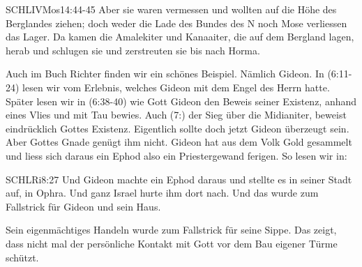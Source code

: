 \documentclass[fontsize=16pt]{mybib}
\begin{document}
\begin{bibelbox}{SCHL}{IVMos}{14:44-45}
        Aber sie waren vermessen und wollten auf die Höhe des Berglandes ziehen; doch weder die Lade des Bundes des \herr N noch Mose verliessen das Lager. Da kamen die Amalekiter und Kanaaiter, die auf dem Bergland lagen, herab und schlugen sie und zerstreuten sie bis nach Horma.
    \end{bibelbox} 
\begin{otsblock}
    Auch im Buch Richter finden wir ein schönes Beispiel. Nämlich Gideon. In (6:11-24) lesen wir vom Erlebnis, welches Gideon mit dem Engel des Herrn hatte. Später lesen wir in (6:38-40) wie Gott Gideon den Beweis seiner Existenz, anhand eines Vlies und mit Tau bewies. Auch (7:) der Sieg über die Midianiter, beweist eindrücklich Gottes Existenz. Eigentlich sollte doch jetzt Gideon überzeugt sein. Aber Gottes Gnade genügt ihm nicht. Gideon hat aus dem Volk Gold gesammelt und liess sich daraus ein Ephod also ein Priestergewand ferigen. So lesen wir in:
    \begin{bibelbox}{SCHL}{Ri}{8:27}
        Und Gideon machte ein Ephod daraus und stellte es in seiner Stadt auf, in Ophra. Und ganz Israel hurte ihm dort nach. Und das wurde zum Fallstrick für Gideon und sein Haus.
    \end{bibelbox} 
    Sein eigenmächtiges Handeln wurde zum Fallstrick für seine Sippe. Das zeigt, dass nicht mal der persönliche Kontakt mit Gott vor dem Bau eigener Türme schützt.
\end{otsblock}
\end{document}
